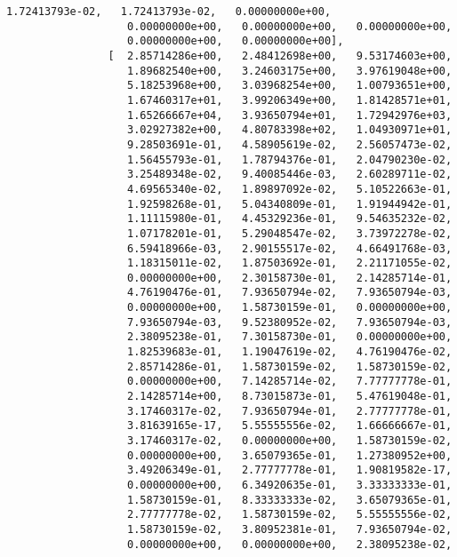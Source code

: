 \documentclass[11pt]{article}
\begin{document}
\begin{Verbatim}[commandchars=\\\{\}]
                   1.72413793e-02,   1.72413793e-02,   0.00000000e+00,
                   0.00000000e+00,   0.00000000e+00,   0.00000000e+00,
                   0.00000000e+00,   0.00000000e+00],
                [  2.85714286e+00,   2.48412698e+00,   9.53174603e+00,
                   1.89682540e+00,   3.24603175e+00,   3.97619048e+00,
                   5.18253968e+00,   3.03968254e+00,   1.00793651e+00,
                   1.67460317e+01,   3.99206349e+00,   1.81428571e+01,
                   1.65266667e+04,   3.93650794e+01,   1.72942976e+03,
                   3.02927382e+00,   4.80783398e+02,   1.04930971e+01,
                   9.28503691e-01,   4.58905619e-02,   2.56057473e-02,
                   1.56455793e-01,   1.78794376e-01,   2.04790230e-02,
                   3.25489348e-02,   9.40085446e-03,   2.60289711e-02,
                   4.69565340e-02,   1.89897092e-02,   5.10522663e-01,
                   1.92598268e-01,   5.04340809e-01,   1.91944942e-01,
                   1.11115980e-01,   4.45329236e-01,   9.54635232e-02,
                   1.07178201e-01,   5.29048547e-02,   3.73972278e-02,
                   6.59418966e-03,   2.90155517e-02,   4.66491768e-03,
                   1.18315011e-02,   1.87503692e-01,   2.21171055e-02,
                   0.00000000e+00,   2.30158730e-01,   2.14285714e-01,
                   4.76190476e-01,   7.93650794e-02,   7.93650794e-03,
                   0.00000000e+00,   1.58730159e-01,   0.00000000e+00,
                   7.93650794e-03,   9.52380952e-02,   7.93650794e-03,
                   2.38095238e-01,   7.30158730e-01,   0.00000000e+00,
                   1.82539683e-01,   1.19047619e-02,   4.76190476e-02,
                   2.85714286e-01,   1.58730159e-02,   1.58730159e-02,
                   0.00000000e+00,   7.14285714e-02,   7.77777778e-01,
                   2.14285714e+00,   8.73015873e-01,   5.47619048e-01,
                   3.17460317e-02,   7.93650794e-01,   2.77777778e-01,
                   3.81639165e-17,   5.55555556e-02,   1.66666667e-01,
                   3.17460317e-02,   0.00000000e+00,   1.58730159e-02,
                   0.00000000e+00,   3.65079365e-01,   1.27380952e+00,
                   3.49206349e-01,   2.77777778e-01,   1.90819582e-17,
                   0.00000000e+00,   6.34920635e-01,   3.33333333e-01,
                   1.58730159e-01,   8.33333333e-02,   3.65079365e-01,
                   2.77777778e-02,   1.58730159e-02,   5.55555556e-02,
                   1.58730159e-02,   3.80952381e-01,   7.93650794e-02,
                   0.00000000e+00,   0.00000000e+00,   2.38095238e-02,

\end{Verbatim}
\end{document}
